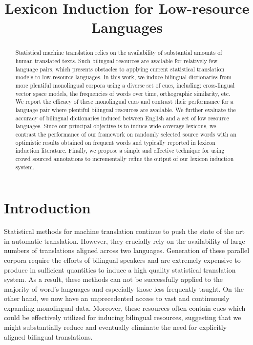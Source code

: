 \documentclass{article}
\title{Lexicon Induction for Low-resource Languages}
\newcommand{\mnote}[1]{\marginpar{%
  \vskip-\baselineskip
  \raggedright\footnotesize
  \itshape\hrule\smallskip\tiny{#1}\par\smallskip\hrule}}
\newcommand{\mtodo}[1]{\mnote{\textcolor{red}{#1}}}
\begin{document}
\maketitle

\begin{abstract}

Statistical machine translation relies on the availability of substantial amounts of human translated texts. Such bilingual resources are available for relatively few language pairs, which presents obstacles to applying current statistical translation models to low-resource languages. In this work, we induce bilingual dictionaries from more plentiful monolingual corpora using a diverse set of cues, including: cross-lingual vector space models, the frequencies of words over time, orthographic similarity, etc.  We report the efficacy of these monolingual cues and contrast their performance for a language pair where plentiful bilingual resources are available.  We further evaluate the accuracy of bilingual dictionaries induced between English and a set of low resource languages.  Since our principal objective is to induce wide coverage lexicons, we contrast the performance of our framework on randomly selected source words with an optimistic results obtained on frequent words and typically reported in lexicon induction literature.  Finally, we propose a simple and effective technique for using crowd sourced annotations to incrementally refine the output of our lexicon induction system.\mtodo{Last sentence doesn't fit too well.}
\end{abstract}

\section{Introduction}

Statistical methods for machine translation continue to push the state of the art in automatic translation. However, they crucially rely on the availability of large numbers of translations aligned across two languages. Generation of these parallel corpora require the efforts of bilingual speakers and are extremely expensive to produce in sufficient quantities to induce a high quality statistical translation system. As a result, these methods can not be successfully applied to the majority of word's languages and especially those less frequently taught.  On the other hand, we now have an unprecedented access to vast and continuously expanding monolingual data.  Moreover, these resources often contain cues which could be effectively utilized for inducing bilingual resources, suggesting that we might substantially reduce and eventually eliminate the need for explicitly aligned bilingual translations.\mtodo{Wordy and vague.}\\
\end{document}
